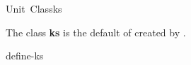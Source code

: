 \documentclass[10pt,twoside,english,pdftex]{article}
\begin{document}

\begin{functiondoc}{Unit~Class}{ks}{}
%
%

\fnsyntax

\fnpackage {}

\fnmodule {}

\fndescription 
{}%
The class \textbf{ks} is the default  of
 created by .

\begin{alsos}{define-ks}
\also[define-ks]
\also[ksa]
\end{alsos}

\end{functiondoc}

\end{document}
